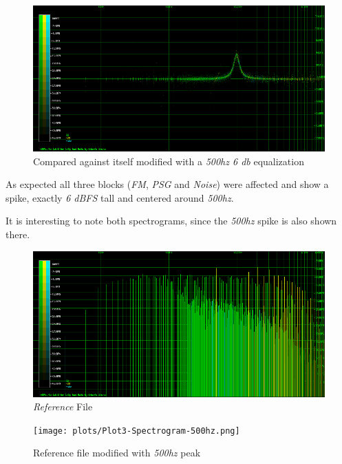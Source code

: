 \documentclass[10pt,a4paper]{report}
\begin{document}
\begin{figure}[H]
	\centering
	\includegraphics[width=1.0\linewidth]{plots/Plot3-Modified.png}
	\caption[1kHz modified]{Compared against itself modified with a \textit{500hz 6 db} equalization}
	\label{fig:plot3-modified}
\end{figure}

As expected all three blocks (\textit{FM}, \textit{PSG} and \textit{Noise}) were affected and show a spike, exactly \textit{6 dBFS} tall and centered around \textit{500hz}.

It is interesting to note both spectrograms, since the \textit{500hz} spike is also shown there.

\begin{figure}[H]
	\centering
	\includegraphics[width=1.0\linewidth]{plots/Plot3-Spectrogram.png}
	\caption[Reference File]{\textit{Reference} File}
	\label{fig:plot3-spectrogram}
\end{figure}

\begin{figure}[H]
	\centering
	\texttt{[image: plots/Plot3-Spectrogram-500hz.png]}
	\caption[Reference File]{Reference file modified with \textit{500hz} peak}
	\label{fig:plot3-spectrogram-1kHz}
\end{figure}
\end{document}
